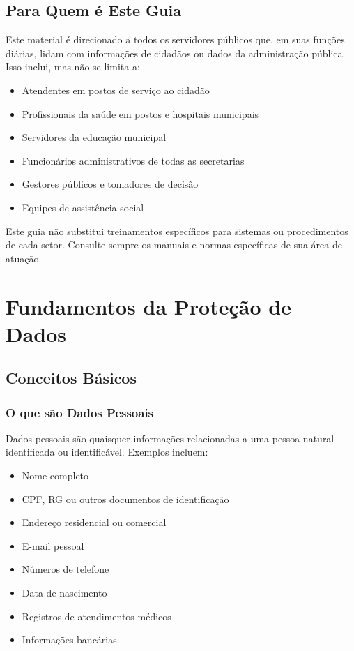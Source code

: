 \documentclass[12pt,a4paper]{article}
\begin{document}
\subsection{Para Quem é Este Guia}
Este material é direcionado a todos os servidores públicos que, em suas funções diárias, lidam com informações de cidadãos ou dados da administração pública. Isso inclui, mas não se limita a:
\begin{itemize}
    \item Atendentes em postos de serviço ao cidadão
    \item Profissionais da saúde em postos e hospitais municipais
    \item Servidores da educação municipal
    \item Funcionários administrativos de todas as secretarias
    \item Gestores públicos e tomadores de decisão
    \item Equipes de assistência social
\end{itemize}

\begin{tcolorbox}[colback=azulclaro, colframe=blue!75!black, title=Lembre-se]
Este guia não substitui treinamentos específicos para sistemas ou procedimentos de cada setor. Consulte sempre os manuais e normas específicas de sua área de atuação.
\end{tcolorbox}

\newpage
\section{Fundamentos da Proteção de Dados}

\subsection{Conceitos Básicos}

\subsubsection{O que são Dados Pessoais}
Dados pessoais são quaisquer informações relacionadas a uma pessoa natural identificada ou identificável. Exemplos incluem:
\begin{itemize}
    \item Nome completo
    \item CPF, RG ou outros documentos de identificação
    \item Endereço residencial ou comercial
    \item E-mail pessoal
    \item Números de telefone
    \item Data de nascimento
    \item Registros de atendimentos médicos
    \item Informações bancárias
\end{itemize}
\end{document}
